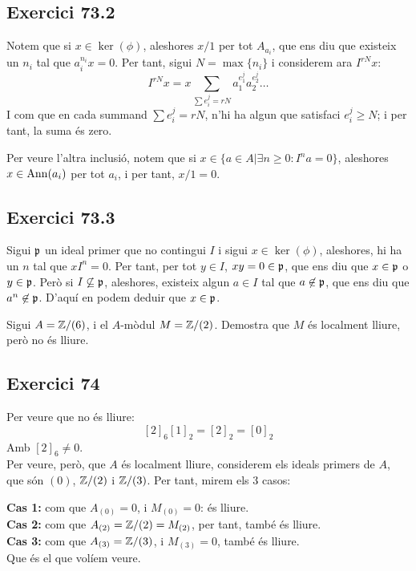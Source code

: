 \documentclass[11pt, a4paper]{article}
\begin{document}
\subsection{Exercici 73.2}
Notem que si $x\in \ker(\phi)$, aleshores $x/1$ per tot $A_{a_i}$, que ens diu que existeix un $n_i$ tal que $a_i^{n_i} x = 0$. Per tant, sigui $N=\max\{n_i\}$ i considerem ara $I^{rN}x$:
\[
    I^{rN} x=x\sum_{\sum e_i^j=rN} a_1^{e_1^j}a_2^{e_2^j}\dots
\]
I com que en cada summand $\sum e_i^j=rN$, n'hi ha algun que satisfaci $e_i^j\geq N$; i per tant, la suma és zero.\par
Per veure l'altra inclusió, notem que si $x\in \{a\in A|\exists n\geq 0: I^na=0\}$, aleshores $x\in \mathrm{Ann}(a_i)$ per tot $a_i$, i per tant, $x/1=0$.
\subsection{Exercici 73.3}
Sigui $\mathfrak p$ un ideal primer que no contingui $I$ i sigui $x\in \ker(\phi)$, aleshores, hi ha un $n$ tal que $xI^n=0$. Per tant, per tot $y\in I$, $xy=0\in \mathfrak p$, que ens diu que $x\in \mathfrak p$ o $y\in \mathfrak p$. Però si $I\not\subseteq \mathfrak p$, aleshores, existeix algun $a\in I$ tal que $a\not \in \mathfrak p$, que ens diu que $a^n\not \in \mathfrak p$. D'aquí en podem deduir que $x\in \mathfrak p$.

\newpage
\begin{tcolorbox}[title=\section{Exercici 74}]
    Sigui $A=\mathbb Z/(6)$, i el $A$-mòdul $M=\mathbb Z/(2)$. Demostra que $M$ és localment lliure, però no és lliure.
\end{tcolorbox}
\subsection{Exercici 74}
Per veure que no és lliure:
\[
    [2]_6[1]_2=[2]_2=[0]_2
\]
Amb $[2]_6\neq 0$.\\
Per veure, però, que $A$ és localment lliure, considerem els ideals primers de $A$, que són $(0)$, $\mathbb Z/(2)$ i $\mathbb Z/(3)$. Per tant, mirem els 3 casos:\par
\textbf{Cas 1:} com que $A_{(0)}=0$, i $M_{(0)}=0$: és lliure.\\
\textbf{Cas 2:} com que $A_{(2)}=\mathbb Z/(2)=M_{(2)}$, per tant, també és lliure.\\
\textbf{Cas 3:} com que $A_{(3)}=\mathbb Z/(3)$, i $M_{(3)}=0$, també és lliure.\\
Que és el que volíem veure.
\end{document}
